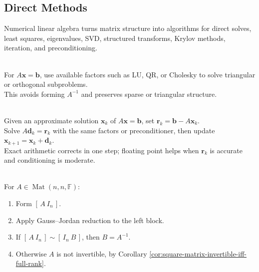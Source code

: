 \subsection{Direct Methods}

%

Numerical linear algebra turns matrix structure into algorithms for direct solves, least squares, eigenvalues, SVD, structured transforms, Krylov methods, iteration, and preconditioning.

\begin{perspective} \label{per:solve-with-factors-not-inverses} \\
For $A\mathbf{x}=\mathbf{b}$, use available factors such as LU, QR, or Cholesky to solve triangular or orthogonal subproblems.\\
This avoids forming $A^{-1}$ and preserves sparse or triangular structure.
\end{perspective}

\begin{perspective} \label{per:iterative-refinement-residual-correction} \\
Given an approximate solution $\mathbf{x}_k$ of $A\mathbf{x}=\mathbf{b}$, set $\mathbf{r}_k=\mathbf{b}-A\mathbf{x}_k$.\\
Solve $A\mathbf{d}_k=\mathbf{r}_k$ with the same factors or preconditioner, then update $\mathbf{x}_{k+1}=\mathbf{x}_k+\mathbf{d}_k$.\\
Exact arithmetic corrects in one step; floating point helps when $\mathbf{r}_k$ is accurate and conditioning is moderate.
\end{perspective}

\begin{method} \label{meth:augmented-inverse-computation-preview} \\
For $A\in\operatorname{Mat}(n,n,\mathbb{F})$:
\begin{enumerate}[label=(\roman*)]
\setlength{\itemsep}{0pt}
\item Form $[\,A\ I_n\,]$.
\item Apply Gauss--Jordan reduction to the left block.
\item If $[\,A\ I_n\,]\sim[\,I_n\ B\,]$, then $B=A^{-1}$.
\item Otherwise $A$ is not invertible, by Corollary \ref{cor:square-matrix-invertible-iff-full-rank}.
\end{enumerate}
\end{method}

